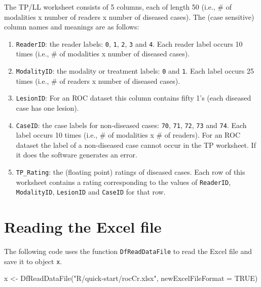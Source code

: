 \documentclass[
]{book}
\newenvironment{Shaded}{\begin{snugshade}}{\end{snugshade}}
\newcommand{\AttributeTok}[1]{\textcolor[rgb]{0.77,0.63,0.00}{#1}}
\newcommand{\ConstantTok}[1]{\textcolor[rgb]{0.00,0.00,0.00}{#1}}
\newcommand{\FunctionTok}[1]{\textcolor[rgb]{0.00,0.00,0.00}{#1}}
\newcommand{\NormalTok}[1]{#1}
\newcommand{\OtherTok}[1]{\textcolor[rgb]{0.56,0.35,0.01}{#1}}
\newcommand{\StringTok}[1]{\textcolor[rgb]{0.31,0.60,0.02}{#1}}
\begin{document}
The TP/LL worksheet consists of 5 columns, each of length 50 (i.e., \# of modalities x number of readers x number of diseased cases). The (case sensitive) column names and meanings are as follows:

\begin{enumerate}
\def\labelenumi{\arabic{enumi}.}
\item
  \texttt{ReaderID}: the reader labels: \texttt{0}, \texttt{1}, \texttt{2}, \texttt{3} and \texttt{4}. Each reader label occurs 10 times (i.e., \# of modalities x number of diseased cases).
\item
  \texttt{ModalityID}: the modality or treatment labels: \texttt{0} and \texttt{1}. Each label occurs 25 times (i.e., \# of readers x number of diseased cases).
\item
  \texttt{LesionID}: For an ROC dataset this column contains fifty 1's (each diseased case has one lesion).
\item
  \texttt{CaseID}: the case labels for non-diseased cases: \texttt{70}, \texttt{71}, \texttt{72}, \texttt{73} and \texttt{74}. Each label occurs 10 times (i.e., \# of modalities x \# of readers). For an ROC dataset the label of a non-diseased case cannot occur in the TP worksheet. If it does the software generates an error.
\item
  \texttt{TP\_Rating}: the (floating point) ratings of diseased cases. Each row of this worksheet contains a rating corresponding to the values of \texttt{ReaderID}, \texttt{ModalityID}, \texttt{LesionID} and \texttt{CaseID} for that row.
\end{enumerate}

\hypertarget{quick-start-roc-read}{%
\section{Reading the Excel file}\label{quick-start-roc-read}}

The following code uses the function \texttt{DfReadDataFile} to read the Excel file and save it to object \texttt{x}.

\begin{Shaded}
\begin{Highlighting}[]
\NormalTok{x }\OtherTok{\textless{}{-}} \FunctionTok{DfReadDataFile}\NormalTok{(}\StringTok{"R/quick{-}start/rocCr.xlsx"}\NormalTok{, }\AttributeTok{newExcelFileFormat =} \ConstantTok{TRUE}\NormalTok{)}
\end{Highlighting}
\end{Shaded}
\end{document}
